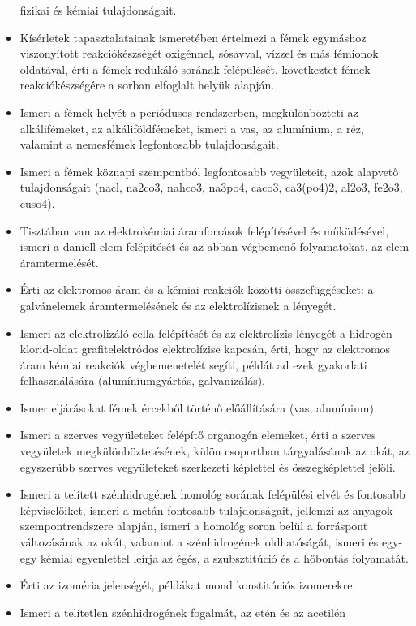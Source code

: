 \begin{itemize}
  fizikai és kémiai tulajdonságait.
\item
  Kísérletek tapasztalatainak ismeretében értelmezi a fémek egymáshoz
  viszonyított reakciókészségét oxigénnel, sósavval, vízzel és más
  fémionok oldatával, érti a fémek redukáló sorának felépülését,
  következtet fémek reakciókészségére a sorban elfoglalt helyük alapján.
\item
  Ismeri a fémek helyét a periódusos rendszerben, megkülönbözteti az
  alkálifémeket, az alkáliföldfémeket, ismeri a vas, az alumínium, a
  réz, valamint a nemesfémek legfontosabb tulajdonságait.
\item
  Ismeri a fémek köznapi szempontból legfontosabb vegyületeit, azok
  alapvető tulajdonságait (nacl, na2co3, nahco3, na3po4, caco3,
  ca3(po4)2, al2o3, fe2o3, cuso4).
\item
  Tisztában van az elektrokémiai áramforrások felépítésével és
  működésével, ismeri a daniell-elem felépítését és az abban végbemenő
  folyamatokat, az elem áramtermelését.
\item
  Érti az elektromos áram és a kémiai reakciók közötti összefüggéseket:
  a galvánelemek áramtermelésének és az elektrolízisnek a lényegét.
\item
  Ismeri az elektrolizáló cella felépítését és az elektrolízis lényegét
  a hidrogén-klorid-oldat grafitelektródos elektrolízise kapcsán, érti,
  hogy az elektromos áram kémiai reakciók végbemenetelét segíti, példát
  ad ezek gyakorlati felhasználására (alumíniumgyártás, galvanizálás).
\item
  Ismer eljárásokat fémek ércekből történő előállítására (vas,
  alumínium).
\item
  Ismeri a szerves vegyületeket felépítő organogén elemeket, érti a
  szerves vegyületek megkülönböztetésének, külön csoportban
  tárgyalásának az okát, az egyszerűbb szerves vegyületeket szerkezeti
  képlettel és összegképlettel jelöli.
\item
  Ismeri a telített szénhidrogének homológ sorának felépülési elvét és
  fontosabb képviselőiket, ismeri a metán fontosabb tulajdonságait,
  jellemzi az anyagok szempontrendszere alapján, ismeri a homológ soron
  belül a forráspont változásának az okát, valamint a szénhidrogének
  oldhatóságát, ismeri és egy-egy kémiai egyenlettel leírja az égés, a
  szubsztitúció és a hőbontás folyamatát.
\item
  Érti az izoméria jelenségét, példákat mond konstitúciós izomerekre.
\item
  Ismeri a telítetlen szénhidrogének fogalmát, az etén és az acetilén

\end{itemize}
